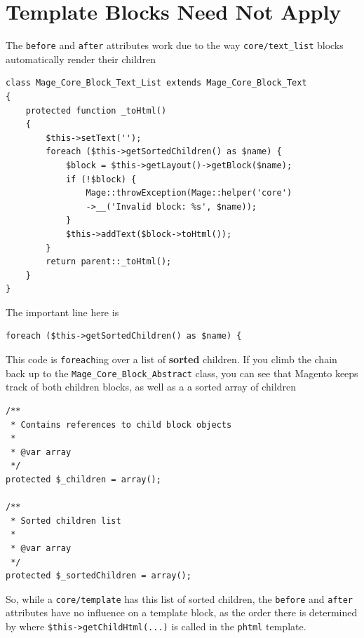 \documentclass[oneside]{book}
\begin{document}
\section{Template Blocks Need Not Apply}

The \footnotesize\texttt{before} \normalsize  and \footnotesize\texttt{after} \normalsize  attributes work due to the way \footnotesize\texttt{core/text\_list} \normalsize  blocks automatically render their children

\begin{lstlisting}
class Mage_Core_Block_Text_List extends Mage_Core_Block_Text
{
    protected function _toHtml()
    {
        $this->setText('');
        foreach ($this->getSortedChildren() as $name) {
            $block = $this->getLayout()->getBlock($name);
            if (!$block) {
                Mage::throwException(Mage::helper('core')
                ->__('Invalid block: %s', $name));
            }
            $this->addText($block->toHtml());
        }
        return parent::_toHtml();
    }
}

\end{lstlisting}


The important line here is

\begin{lstlisting}
foreach ($this->getSortedChildren() as $name) {

\end{lstlisting}


This code is \footnotesize\texttt{foreach}\normalsize ing over a list of \textbf{sorted} children.  If you climb the chain back up to the \footnotesize\texttt{Mage\_Core\_Block\_Abstract} \normalsize     class, you can see that Magento keeps track of both children blocks, as well as a a sorted array of children

\begin{lstlisting}
/**
 * Contains references to child block objects
 *
 * @var array
 */
protected $_children = array();

/**
 * Sorted children list
 *
 * @var array
 */
protected $_sortedChildren = array();

\end{lstlisting}


So, while a \footnotesize\texttt{core/template} \normalsize  has this list of sorted children, the \footnotesize\texttt{before} \normalsize  and \footnotesize\texttt{after} \normalsize  attributes have no influence on a template block, as the order there is determined by where \footnotesize\texttt{\$this-\textgreater getChildHtml(...)} \normalsize  is called in the \footnotesize\texttt{phtml} \normalsize  template.
\end{document}

